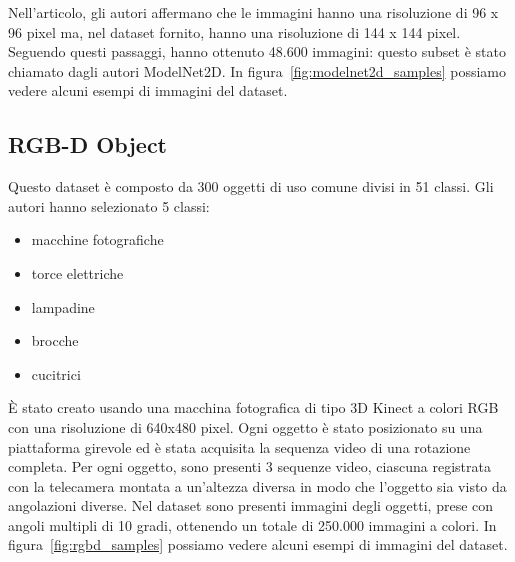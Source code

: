 \documentclass[italian,12pt,a4paper,oneside,final]{report}
\begin{document}
Nell'articolo, gli autori affermano che le immagini hanno una risoluzione di 96 x 96 pixel ma, nel dataset fornito, hanno una risoluzione di 144 x 144 pixel.
Seguendo questi passaggi, hanno ottenuto 48.600 immagini: questo subset è stato chiamato dagli autori ModelNet2D.
In figura~\ref{fig:modelnet2d_samples} possiamo vedere alcuni esempi di immagini del dataset.

\subsection{RGB-D Object}
Questo dataset\cite{dataset:rgb-d} è composto da 300 oggetti di uso comune divisi in 51 classi.
Gli autori hanno selezionato 5 classi:
\begin{itemize}
	\item macchine fotografiche
	\item torce elettriche
	\item lampadine
	\item brocche
	\item cucitrici
\end{itemize}
È stato creato usando una macchina fotografica di tipo 3D Kinect a colori RGB con una risoluzione di 640x480 pixel.
Ogni oggetto è stato posizionato su una piattaforma girevole ed è stata acquisita la sequenza video di una rotazione completa.
Per ogni oggetto, sono presenti 3 sequenze video, ciascuna registrata con la telecamera montata a un'altezza diversa in modo che l'oggetto sia visto da angolazioni diverse.
Nel dataset sono presenti immagini degli oggetti, prese con angoli multipli di 10 gradi, ottenendo un totale di 250.000 immagini a colori.
In figura~\ref{fig:rgbd_samples} possiamo vedere alcuni esempi di immagini del dataset.
\end{document}
